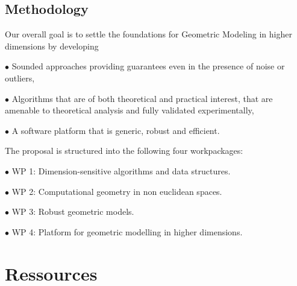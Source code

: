 





\subsection{Methodology}

Our overall goal is to settle the foundations for Geometric Modeling in higher dimensions by
developing 

\sind $\bullet$ Sounded approaches providing guarantees even in the presence of noise or outliers,


\sind $\bullet$  Algorithms that are of both theoretical and practical interest, that are amenable to theoretical analysis and fully validated experimentally,

\sind $\bullet$ A software platform that is generic, robust and efficient.

The proposal is structured into the following four workpackages:


\sind $\bullet$  {WP 1:  Dimension-sensitive algorithms and data  structures.} 


\sind $\bullet$  {WP 2:  Computational geometry in non euclidean spaces.}


\sind $\bullet$  {WP 3: Robust geometric models.}


\sind $\bullet$  {WP 4:  Platform for geometric modelling in higher dimensions. } 











\section{Ressources}


